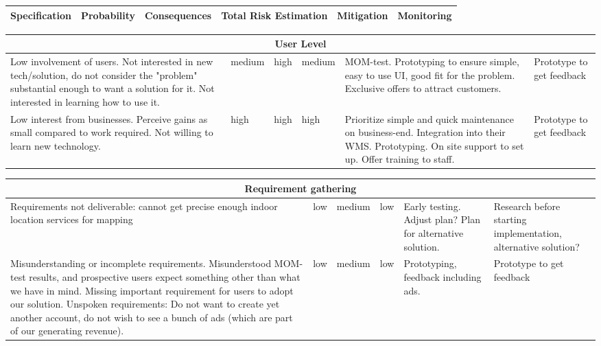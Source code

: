 \documentclass[titlepage]{article}
\begin{document}
\begin{center}
\begin{tabular}{|p{3cm}|p{2cm}|p{2cm}|p{2cm}|p{2cm}|p{2cm}|}
\hline
 Specification & Probability & Consequences & Total Risk Estimation & Mitigation & Monitoring \\
 \hline
 \end{tabular}
\end{center}

\begin{center}
\begin{tabular}{|p{3cm}|p{2cm}|p{2cm}|p{2cm}|p{2cm}|p{2cm}|}
 \hline
 \multicolumn{6}{|c|}{User Level} \\
 \hline
 Low involvement of users. Not interested in new tech/solution, do not consider the "problem" substantial enough to want a solution for it. Not interested in learning how to use it. & medium & high & medium & MOM-test. Prototyping to ensure simple, easy to use UI, good fit for the problem. Exclusive offers to attract customers. & Prototype to get feedback \\  
 \hline
 Low interest from businesses. Perceive gains as small compared to work required. Not willing to learn new technology. & high & high & high & Prioritize simple and quick maintenance on business-end. Integration into their WMS. Prototyping. On site support to set up. Offer training to staff. & Prototype to get feedback \\  
 \hline
 \end{tabular}
\end{center}

 \begin{center}
 \begin{tabular}{|p{3cm}|p{2cm}|p{2cm}|p{2cm}|p{2cm}|p{2cm}|}
 \hline
 \multicolumn{6}{|c|}{Requirement gathering} \\
 \hline
 Requirements not deliverable: cannot get precise enough indoor location services for mapping & low & medium & low & Early testing. Adjust plan? Plan for alternative solution. & Research before starting implementation, alternative solution? \\
 \hline
 Misunderstanding or incomplete requirements. Misunderstood MOM-test results, and prospective users expect something other than what we have in mind. Missing important requirement for users to adopt our solution. Unspoken requirements: Do not want to create yet another account, do not wish to see a bunch of ads (which are part of our generating revenue). & low & medium & low & Prototyping, feedback including ads. & Prototype to get feedback \\
 \hline
 \end{tabular}
 \end{center}
\end{document}
